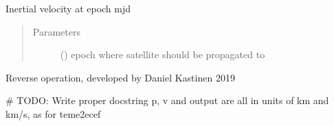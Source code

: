 \documentclass[letterpaper,10pt,english]{sphinxmanual}
\begin{document}
\begin{fulllineitems}
\begin{fulllineitems}
\begin{quote}
\begin{description}
\end{description}\end{quote}

\end{fulllineitems}


\begin{fulllineitems}
\label{\detokenize{modules/propagator_sgp4:propagator_sgp4.SGP4.velocity}}
Inertial velocity at epoch mjd
\begin{quote}\begin{description}
\item[{Parameters}] \leavevmode
{} () \textendash{} epoch where satellite should be propagated to

\end{description}\end{quote}

\end{fulllineitems}


\end{fulllineitems}


\begin{fulllineitems}
\label{\detokenize{modules/propagator_sgp4:propagator_sgp4.ecef2teme}}
Reverse operation, developed by Daniel Kastinen 2019

\# TODO: Write proper docstring
p, v and output are all in units of km and km/s, as for teme2ecef

\end{fulllineitems}

\end{document}
